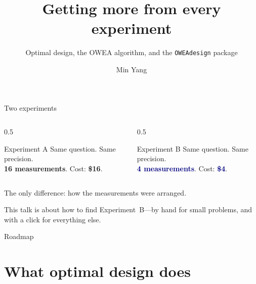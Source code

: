 \documentclass[aspectratio=169,10pt]{beamer}
\title{Getting more from every experiment}
\subtitle{Optimal design, the OWEA algorithm, and the \texttt{OWEAdesign} package}
\author{Min Yang}
\institute{University of Illinois at Chicago}
\date{}
\newcommand{\hl}[1]{\textcolor{brick}{\textbf{#1}}}
\newcommand{\key}[1]{\textcolor{navy}{\textbf{#1}}}
\begin{document}
\maketitle

\begin{frame}{Two experiments}
  \begin{columns}[T]
    \begin{column}{0.5\textwidth}
      \begin{block}{Experiment A}
        Same question. Same precision.\\[2pt]
        \hl{16 measurements}. Cost: \hl{\$16}.
      \end{block}
    \end{column}
    \begin{column}{0.5\textwidth}
      \begin{block}{Experiment B}
        Same question. Same precision.\\[2pt]
        \key{4 measurements}. Cost: \key{\$4}.
      \end{block}
    \end{column}
  \end{columns}
  \vspace{1.2em}
  \centering
  \Large The only difference: \alert{how the measurements were arranged.}

  \vspace{1em}
  \normalsize
  This talk is about how to find Experiment~B---by hand for small problems,
  and with a click for everything else.
\end{frame}

\begin{frame}{Roadmap}
  \tableofcontents
\end{frame}

\section{What optimal design does}
\end{document}
